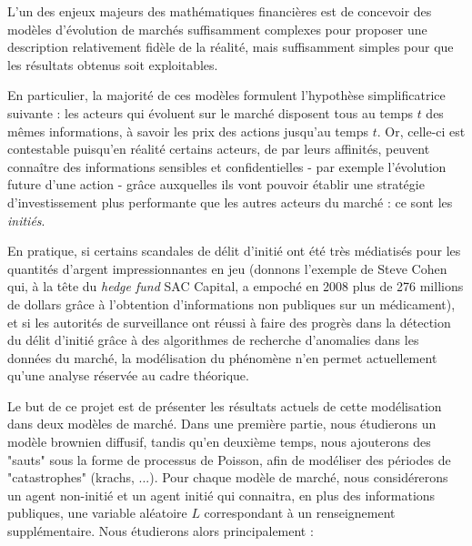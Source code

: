\documentclass[../finalreport.tex]{subfiles}
\begin{document}
\par L'un des enjeux majeurs des mathématiques financières est de concevoir des modèles d'évolu\-tion de marchés suffisamment complexes pour proposer une description relativement fidèle de la réalité, mais suffisamment simples pour que les résultats obtenus soit exploitables.

\vspace{5mm}

\par En particulier, la majorité de ces modèles formulent l'hypothèse simplificatrice suivante : les acteurs qui évoluent sur le marché disposent tous au temps $t$ des mêmes informations, à savoir les prix des actions jusqu'au temps $t$. Or, celle-ci est contestable puisqu'en réalité certains acteurs, de par leurs affinités, peuvent connaître des informations sensibles et confidentielles - par exemple l'évolution future d'une action - grâce auxquelles ils vont pouvoir établir une stratégie d'investissement plus performante que les autres acteurs du marché : ce sont les \emph{initiés}. 

\vspace{5mm}

\par En pratique, si certains scandales de délit d'initié ont été très médiatisés pour les quantités d'argent impressionnantes en jeu (donnons l'exemple de Steve Cohen qui, à la tête du \emph{hedge fund} SAC Capital, a empoché en 2008 plus de 276 millions de dollars grâce à l'obtention d'informations non publiques sur un médicament), et si les autorités de surveillance ont réussi à faire des progrès dans la détection du délit d'initié grâce à des algorithmes de recherche d'anomalies dans les données du marché, la modélisation du phénomène n'en permet actuellement qu'une analyse réservée au cadre théorique.

\vspace{5mm}

\par Le but de ce projet est de présenter les résultats actuels de cette modélisation dans deux modèles de marché. Dans une première partie, nous étudierons un modèle brownien diffusif, tandis qu'en deuxième temps, nous ajouterons des "sauts" sous la forme de processus de Poisson, afin de modéliser des périodes de "catastrophes" (krachs, ...). Pour chaque modèle de marché, nous considére\-rons un agent non-initié et un agent initié qui connaitra, en plus des informations publiques, une variable aléatoire $L$ correspondant à un renseignement supplémentaire. Nous étudierons alors principalement :
\end{document}
